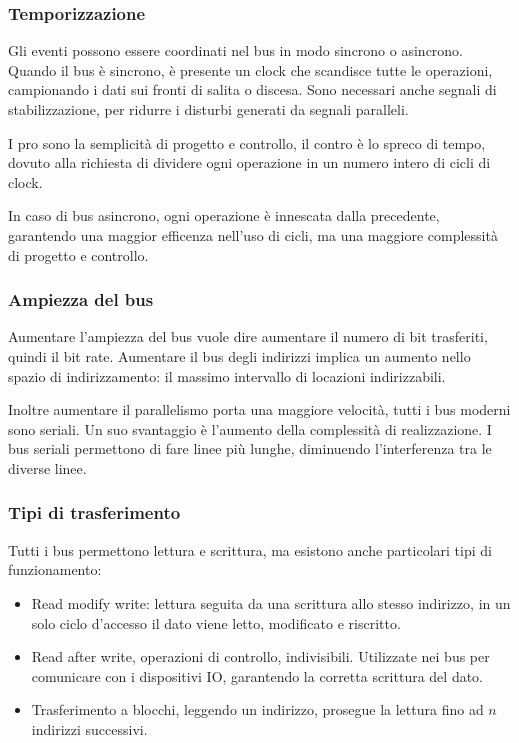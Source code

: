 \documentclass[../template]{subfiles}
\begin{document}
\subsubsection{Temporizzazione}
Gli eventi possono essere coordinati nel bus in modo sincrono o asincrono. Quando il bus è sincrono, è presente un clock che scandisce tutte le operazioni, campionando i dati sui fronti di salita o discesa.
Sono necessari anche segnali di stabilizzazione, per ridurre i disturbi generati da segnali paralleli.

I pro sono la semplicità di progetto e controllo, il contro è lo spreco di tempo, dovuto alla richiesta di dividere ogni operazione in un numero intero di cicli di clock.

In caso di bus asincrono, ogni operazione è innescata dalla precedente, garantendo una maggior efficenza nell'uso di cicli, ma una maggiore complessità di progetto e controllo.

\subsubsection{Ampiezza del bus}
Aumentare l'ampiezza del bus vuole dire aumentare il numero di bit trasferiti, quindi il bit rate.
Aumentare il bus degli indirizzi implica un aumento nello spazio di indirizzamento: il massimo intervallo di locazioni indirizzabili.

Inoltre aumentare il parallelismo porta una maggiore velocità, tutti i bus moderni sono seriali. Un suo svantaggio è l'aumento della complessità di realizzazione.
I bus seriali permettono di fare linee più lunghe, diminuendo l'interferenza tra le diverse linee.

\subsubsection{Tipi di trasferimento}
Tutti i bus permettono lettura e scrittura, ma esistono anche particolari tipi di funzionamento:
\begin{itemize}
    \item Read modify write: lettura seguita da una scrittura allo stesso indirizzo, in un solo ciclo d'accesso il dato viene letto, modificato e riscritto.
    \item Read after write, operazioni di controllo, indivisibili. Utilizzate nei bus per comunicare con i dispositivi IO, garantendo la corretta scrittura del dato.
    \item Trasferimento a blocchi, leggendo un indirizzo, prosegue la lettura fino ad $n$ indirizzi successivi.
\end{itemize}
\end{document}
